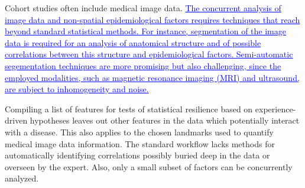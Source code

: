 \documentclass[journal]{style/vgtc} 			          %
\newcommand{\add}[1]{\textcolor{blue}{\uline{#1}}}
\begin{document}
%
Cohort studies often include medical image data.
% 
\add{The concurrent analysis of image data and non-spatial epidemiological factors requires techniques that reach beyond standard statistical methods.
%
For instance, segmentation of the image data is required for an analysis of anatomical structure and of possible correlations between this structure and epidemiological factors.
%
Semi-automatic segementation techniques are more promising but also challenging, since the employed modalities, such as magnetic resonance imaging (MRI) and ultrasound, are subject to inhomogeneity and noise.}
%

Compiling a list of features for tests of statistical resilience based on experience-driven hypotheses leaves out other features in the data which potentially interact with a disease.
%
This also applies to the chosen landmarks used to quantify medical image data information.
%
%
The standard workflow lacks methods for automatically identifying correlations possibly buried deep in the data or overseen by the expert.
%
Also, only a small subset of factors can be concurrently analyzed.
%
\end{document}
